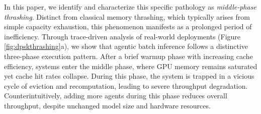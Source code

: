 
In this paper, we identify and characterize this specific pathology as \emph{middle-phase thrashing}. Distinct from classical memory thrashing, which typically arises from simple capacity exhaustion, this phenomenon manifests as a prolonged period of inefficiency. Through trace-driven analysis of real-world deployments (Figure \ref{fig:dpskthrashing}a), we show that agentic batch inference follows a distinctive three-phase execution pattern. After a brief warmup phase with increasing cache efficiency, systems enter the middle phase, where GPU memory remains saturated yet cache hit rates collapse. During this phase, the system is trapped in a vicious cycle of eviction and recomputation, leading to severe throughput degradation. Counterintuitively, adding more agents during this phase reduces overall throughput, despite unchanged model size and hardware resources.




